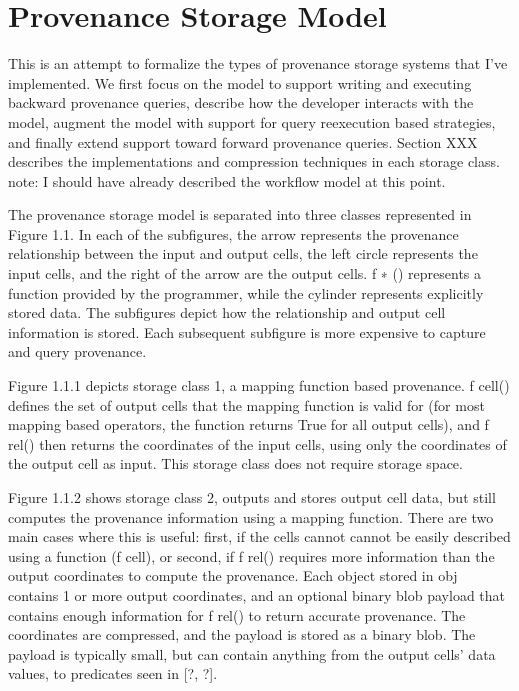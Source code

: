 \section{Provenance Storage Model}

This is an attempt to formalize the types of provenance storage systems that I’ve implemented. We first focus on the model to support writing and executing backward provenance queries, describe how the developer interacts with the model, augment the model with support for query reexecution based strategies, and finally extend support toward forward provenance queries.
Section XXX describes the implementations and compression techniques in each storage class.
note: I should have already described the workflow model at this point.

The provenance storage model is separated into three classes represented in Figure 1.1. In each of the subfigures, the arrow represents the provenance relationship between the input and output cells, the left circle represents the input cells, and the right of the arrow are the output cells. f ∗ () represents a function provided by the programmer, while the cylinder represents explicitly stored data. The subfigures depict how the relationship and output cell information is stored. Each subsequent subfigure is more expensive to capture and query provenance.

Figure 1.1.1 depicts storage class 1, a mapping function based provenance. f cell() defines the set of output cells that the mapping function is valid for (for most mapping based operators, the function returns True for all output cells), and f rel() then returns the coordinates of the input cells, using only the coordinates of the output cell as input. This storage class does not require storage space.

Figure 1.1.2 shows storage class 2, outputs and stores output cell data, but still computes the provenance information using a mapping function. There are two main cases where this is useful: first, if the cells cannot cannot be easily described using a function (f cell), or second, if f rel() requires more information than the output coordinates to compute the provenance. Each object stored in obj contains 1 or more output coordinates, and an optional binary blob payload that contains enough information for f rel() to return accurate provenance. The coordinates are compressed, and the payload is stored as a binary blob. The payload is typically small, but can contain anything from the output cells’ data values, to predicates seen in [?, ?].


